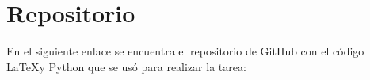 \section{Repositorio}

En el siguiente enlace se encuentra el repositorio de GitHub con el código \LaTeX y Python que se usó para realizar la tarea: \url{}